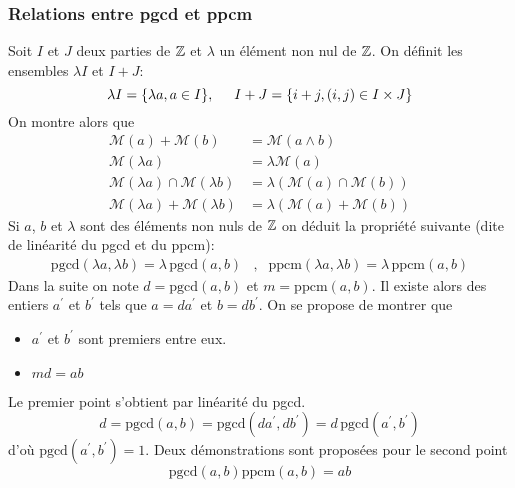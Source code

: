 \subsubsection{Relations entre pgcd et ppcm}
Soit $I$ et $J$ deux parties de $\mathbb{Z}$ et $\lambda$ un élément non nul de $\mathbb{Z}$. On définit les ensembles $\lambda I$ et $I+J$:
\begin{displaymath}
  \lambda I = \{\lambda a , a\in I\} ,\hspace{0.5cm} I+J = \left\lbrace i+j, (i,j)\in I\times J\right\rbrace 
\end{displaymath}
On montre alors que 
\begin{align*}
\mathcal{M}(a) + \mathcal{M}(b) &= \mathcal{M}(a\wedge b) \\
 \mathcal M (\lambda a) &= \lambda \mathcal M ( a) \\
\mathcal M (\lambda a)\cap  \mathcal M (\lambda b) &= \lambda \left( \mathcal M ( a) \cap  \mathcal M (b)\right) \\
\mathcal M (\lambda a) + \mathcal M (\lambda b) &= \lambda \left( \mathcal M ( a) +  \mathcal M (b)\right)
\end{align*}
Si $a$, $b$ et $\lambda$ sont des éléments non nuls de $\mathbb{Z}$ on déduit la propriété suivante (dite de linéarité du pgcd et du ppcm):
\begin{align*}
 \text{pgcd}(\lambda a, \lambda b)=\lambda\, \text{pgcd}(a, b) &,& \text{ppcm}(\lambda a, \lambda b)=\lambda\, \text{ppcm}(a, b)
\end{align*}
Dans la suite on note $d=\text{pgcd}(a,b)$ et $m=\text{ppcm}(a, b)$. Il existe alors des entiers $a^\prime$ et $b^\prime$ tels que $a=da^\prime$ et $b=db^\prime$. On se propose de montrer que 
\begin{itemize}
 \item $a^\prime$ et $b^\prime$ sont premiers entre eux.
 \item $md=ab$
\end{itemize}
Le premier point s'obtient par linéarité du pgcd.
\begin{displaymath}
 d=\text{pgcd}(a,b)=\text{pgcd}(da^\prime,db^\prime)=d\,\text{pgcd}(a^\prime,b^\prime)
\end{displaymath}
d'où $\text{pgcd}(a^\prime,b^\prime)=1$.\newline
Deux démonstrations sont proposées pour le second point 
\begin{displaymath}
 \text{pgcd}(a,b)\text{ppcm}(a,b)=ab
\end{displaymath}

